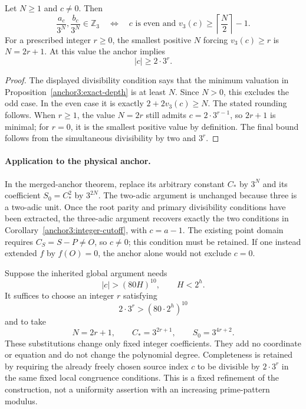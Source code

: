 \begin{corollary}\label{anchor3:integer-cutoff}
Let $N\ge1$ and $c\ne0$.  Then
\[
 \frac{a_c}{3^N},\frac{b_c}{3^N}\in\mathbb Z_3
 \quad\Longleftrightarrow\quad
 c\text{ is even and }v_3(c)\ge\left\lceil\frac N2\right\rceil-1.
\]
For a prescribed integer $r\ge0$, the smallest positive $N$ forcing
$v_3(c)\ge r$ is $N=2r+1$.  At this value the anchor implies
\[
                             |c|\ge2\cdot3^r.
\]
\end{corollary}
\begin{proof}
The displayed divisibility condition says that the minimum valuation in
Proposition~\ref{anchor3:exact-depth} is at least $N$.  Since $N>0$,
this excludes the odd case.  In the even case it is exactly
$2+2v_3(c)\ge N$.  The stated rounding follows.  When $r\ge1$,
the value $N=2r$ still admits $c=2\cdot3^{r-1}$, so $2r+1$ is
minimal; for $r=0$, it is the smallest positive value by definition.
The final bound follows from the simultaneous divisibility by two and
$3^r$.
\end{proof}

\paragraph{Application to the physical anchor.}
In the merged-anchor theorem, replace its arbitrary constant $C_*$ by
$3^N$ and its coefficient $S_0=C_*^2$ by $3^{2N}$.
The two-adic argument is unchanged because three is a two-adic unit.
Once the root parity and primary divisibility conditions have been
extracted, the three-adic argument recovers exactly the two conditions
in Corollary~\ref{anchor3:integer-cutoff}, with $c=a-1$.
The existing point domain requires $C_S=S-P\ne O$, so $c\ne0$;
this condition must be retained.  If one instead extended $f$ by
$f(O)=0$, the anchor alone would not exclude $c=0$.

Suppose the inherited global argument needs
\[
                     |c|>(80H)^{10},\qquad H<2^h.
\]
It suffices to choose an integer $r$ satisfying
\[
                       2\cdot3^r>(80\cdot2^h)^{10}
\]
and to take
\[
                   N=2r+1,\qquad C_*=3^{2r+1},
                   \qquad S_0=3^{4r+2}.
\]
These substitutions change only fixed integer coefficients.  They add
no coordinate or equation and do not change the polynomial degree.
Completeness is retained by requiring the already freely chosen source
index $c$ to be divisible by $2\cdot3^r$ in the same fixed local
congruence conditions.  This is a fixed refinement of the construction,
not a uniformity assertion with an increasing prime-pattern modulus.

